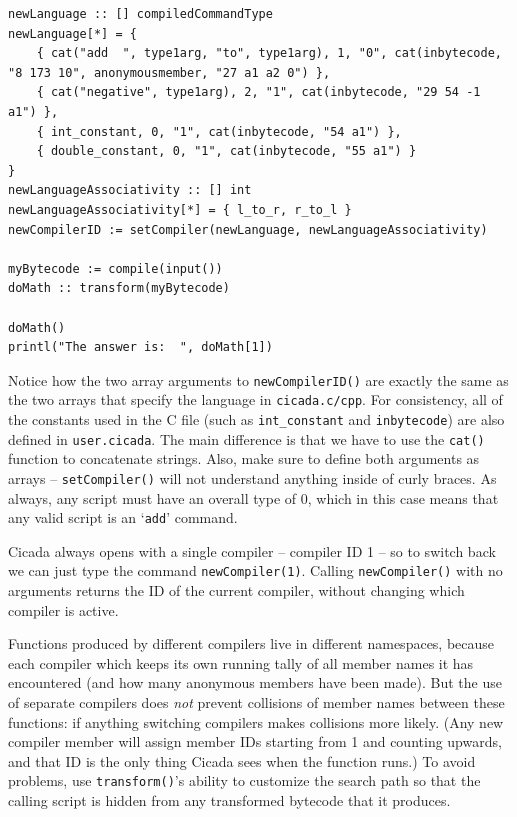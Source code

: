 \documentclass{article}
\newenvironment{code}{
       \begin{list}{}{
               \setlength{\leftmargin}{.4in}
               \setlength{\rightmargin}{0in}
               \setlength{\topsep}{.2in}
       }
       \small
       \item[] }
       { \end{list}   }
\begin{document}
\begin{code} \begin{verbatim}
newLanguage :: [] compiledCommandType
newLanguage[*] = {
    { cat("add  ", type1arg, "to", type1arg), 1, "0", cat(inbytecode, "8 173 10", anonymousmember, "27 a1 a2 0") },
    { cat("negative", type1arg), 2, "1", cat(inbytecode, "29 54 -1 a1") },
    { int_constant, 0, "1", cat(inbytecode, "54 a1") },
    { double_constant, 0, "1", cat(inbytecode, "55 a1") }
}
newLanguageAssociativity :: [] int
newLanguageAssociativity[*] = { l_to_r, r_to_l }
newCompilerID := setCompiler(newLanguage, newLanguageAssociativity)

myBytecode := compile(input())
doMath :: transform(myBytecode)

doMath()
printl("The answer is:  ", doMath[1])
\end{verbatim} \end{code}

\noindent Notice how the two array arguments to \verb#newCompilerID()# are exactly the same as the two arrays that specify the language in \verb#cicada.c/cpp#.  For consistency, all of the constants used in the C file (such as \verb#int_constant# and \verb#inbytecode#) are also defined in \verb#user.cicada#.  The main difference is that we have to use the \verb#cat()# function to concatenate strings.  Also, make sure to define both arguments as arrays -- \verb#setCompiler()# will not understand anything inside of curly braces.  As always, any script must have an overall type of 0, which in this case means that any valid script is an `\verb#add#' command.

Cicada always opens with a single compiler -- compiler ID 1 -- so to switch back we can just type the command \verb#newCompiler(1)#.  Calling \verb#newCompiler()# with no arguments returns the ID of the current compiler, without changing which compiler is active.

Functions produced by different compilers live in different namespaces, because each compiler which keeps its own running tally of all member names it has encountered (and how many anonymous members have been made).  But the use of separate compilers does \emph{not} prevent collisions of member names between these functions:  if anything switching compilers makes collisions more likely.  (Any new compiler member will assign member IDs starting from 1 and counting upwards, and that ID is the only thing Cicada sees when the function runs.)  To avoid problems, use \verb#transform()#'s ability to customize the search path so that the calling script is hidden from any transformed bytecode that it produces.
\end{document}
